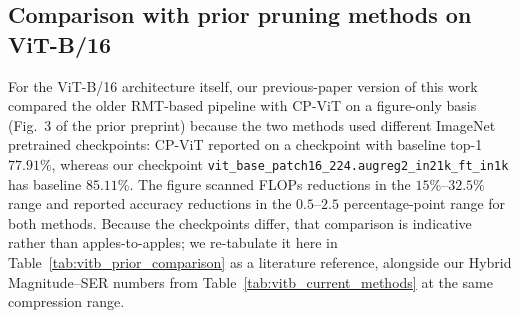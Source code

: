 \documentclass[11pt]{article}
\theoremstyle{plain}
\theoremstyle{definition}
\theoremstyle{remark}
\newcommand{\1}{\mathbf{1}}
\begin{document}
\subsection{Comparison with prior pruning methods on ViT-B/16}
\label{subsec:vitb_prior_comparison}

For the ViT-B/16 architecture itself, our previous-paper version of this work compared the older RMT-based pipeline with CP-ViT \cite{song2022cp} on a figure-only basis (Fig.~3 of the prior preprint) because the two methods used different ImageNet pretrained checkpoints: CP-ViT reported on a checkpoint with baseline top-1 \(77.91\%\), whereas our checkpoint \texttt{vit\_base\_patch16\_224.augreg2\_in21k\_ft\_in1k} has baseline \(85.11\%\).  The figure scanned FLOPs reductions in the \(15\%\)--\(32.5\%\) range and reported accuracy reductions in the \(0.5\)--\(2.5\) percentage-point range for both methods.  Because the checkpoints differ, that comparison is indicative rather than apples-to-apples; we re-tabulate it here in Table~\ref{tab:vitb_prior_comparison} as a literature reference, alongside our Hybrid Magnitude--SER numbers from Table~\ref{tab:vitb_current_methods} at the same compression range.
\end{document}
